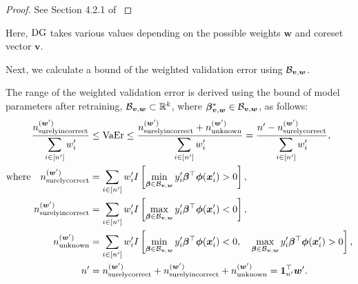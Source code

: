 \begin{proof}
	See Section 4.2.1 of \citep{10.1162/neco_a_01619}
\end{proof}
%
Here, ${\rm DG}$ takes various values depending on the possible weights $\bm w$ and coreset vector $\bm v$.
%

Next, we calculate a bound of the weighted validation error using ${\cal B}_{\bm{v}, \bm{w}}$.
\begin{theorem} \label{thm:acc-lb}
	The range of the weighted validation error is derived using the bound of model parameters after retraining, ${\cal B}_{\bm{v}, \bm{w}} \subset \mathbb{R}^k$, where $\bm{\beta}_{\bm v, \bm w} ^{*} \in {\cal B}_{\bm{v}, \bm{w}}$, as follows:
	\begin{align}
		\displaystyle\frac{n_{\rm surelyincorrect}^{(\bm w')}}{\displaystyle \sum_{i \in\left[n^ \prime \right]} w_i'} & \leq {\rm VaEr} \leq \frac{n_{\rm surelyincorrect}^{(\bm w')} + {n_\mathrm{unknown}^{(\bm w')}}}{\displaystyle \sum_{i \in\left[n^ \prime \right]} w_i'} = \frac{n^\prime - {n_{\rm surelycorrect}^{(\bm w')}}}{\displaystyle \sum_{i \in\left[n^ \prime \right]} w_i'}, \label{eq:error-bound}\\
		\text{where} \quad n_{\rm surelycorrect}^{(\bm w')} & = \sum_{i \in\left[n^ \prime \right]} w_i' I\left[\min_{\bm{\beta} \in {\cal B}_{\bm{v}, \bm{w}}} y_i^{\prime} \bm{\beta}^\top \bm\phi(\bm x^{\prime}_{i}) > 0\right], \label{eq:correct-bound}\\
		n_{\rm surelyincorrect}^{(\bm w')} & = \sum_{i \in\left[n^ \prime \right]} w_i' I\left[\max_{\bm{\beta} \in {\cal B}_{\bm{v}, \bm{w}}} y_i^{\prime} \bm{\beta}^\top \bm\phi(\bm x^{\prime}_{i}) < 0\right], \label{eq:incorrect-bound}\\
		n_\mathrm{unknown}^{(\bm w')} & = \sum_{i \in\left[n^ \prime \right]} w_i' I\left[\min_{\bm{\beta} \in {\cal B}_{\bm{v}, \bm{w}}} y_i^{\prime} \bm{\beta}^\top \bm\phi(\bm x^{\prime}_{i}) < 0, \quad \max_{\bm{\beta} \in {\cal B}_{\bm{v}, \bm{w}}} y_i^{\prime} \bm{\beta}^\top \bm\phi(\bm x^{\prime}_{i}) > 0\right], \label{eq:unknown-bound}\\
		n^\prime & = n_{\rm surelycorrect}^{(\bm w')} + n_{\rm surelyincorrect}^{(\bm w')} + n_{\rm unknown}^{(\bm w')} =
		\bm 1_{n ^\prime}^\top \bm w'.
		\label{eq:n-all}
	\end{align}
\end{theorem}
